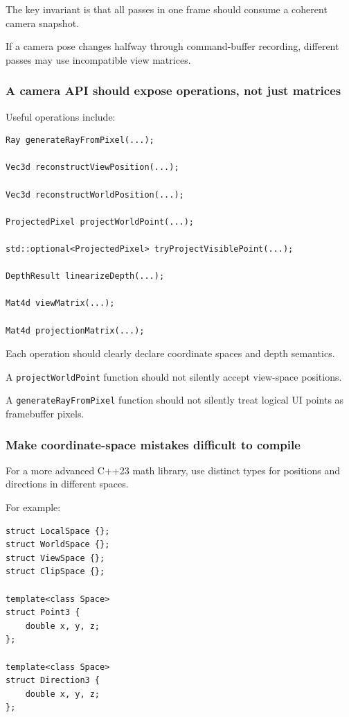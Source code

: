 The key invariant is that all passes in one frame should consume a coherent camera snapshot.

If a camera pose changes halfway through command-buffer recording, different passes may use incompatible view matrices.

\subsubsection{A camera API should expose operations, not just matrices}\label{a-camera-api-should-expose-operations-not-just-matrices}

Useful operations include:

\begin{verbatim}
Ray generateRayFromPixel(...);

Vec3d reconstructViewPosition(...);

Vec3d reconstructWorldPosition(...);

ProjectedPixel projectWorldPoint(...);

std::optional<ProjectedPixel> tryProjectVisiblePoint(...);

DepthResult linearizeDepth(...);

Mat4d viewMatrix(...);

Mat4d projectionMatrix(...);
\end{verbatim}

Each operation should clearly declare coordinate spaces and depth semantics.

A \texttt{projectWorldPoint} function should not silently accept view-space positions.

A \texttt{generateRayFromPixel} function should not silently treat logical UI points as framebuffer pixels.

\subsubsection{Make coordinate-space mistakes difficult to compile}\label{make-coordinate-space-mistakes-difficult-to-compile}

For a more advanced C++23 math library, use distinct types for positions and directions in different spaces.

For example:

\begin{verbatim}
struct LocalSpace {};
struct WorldSpace {};
struct ViewSpace {};
struct ClipSpace {};

template<class Space>
struct Point3 {
    double x, y, z;
};

template<class Space>
struct Direction3 {
    double x, y, z;
};
\end{verbatim}


